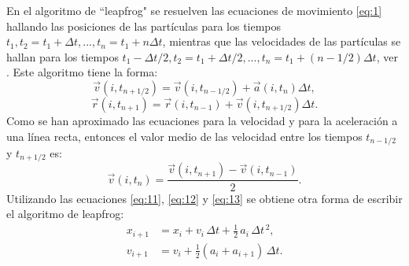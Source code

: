 En el algoritmo de ``leapfrog" se resuelven las ecuaciones de movimiento \eqref{eq:1} hallando las posiciones de las part\'{i}culas para los tiempos $t_1,t_2=t_1+\Delta t,...,t_n=t_{1}+n\Delta t$, mientras que las velocidades de las part\'{i}culas se hallan para los tiempos $t_1-\Delta t/2,t_2=t_1+\Delta t/2,...,t_n=t_{1}+(n-1/2)\Delta t$, ver \cite{Mazur1997CommonRevisited}.  Este algoritmo tiene la forma:
\begin{equation}\label{eq:11}
\vec{v}{(i,t_{n+1/2})}=\vec{v}{(i,t_{n-1/2})}+\vec{a}{(i,t_{n})}\Delta t,
\end{equation}
\begin{equation}\label{eq:12}
\vec{r}{(i,t_{n+1})}=\vec{r}{(i,t_{n-1})}+\vec{v}{(i,t_{n+1/2})}\Delta t.
\end{equation}
Como se han aproximado las ecuaciones para la velocidad y para la aceleraci\'{o}n a una l\'{i}nea recta, entonces el valor medio de las velocidad entre los tiempos $t_{n-1/2}$ y $t_{n+1/2}$ es:
\begin{equation}\label{eq:13}
\vec{v}{(i,t_{n})}=\frac{\vec{v}{(i,t_{n+1})}-\vec{v}{(i,t_{n-1})}}{2}.
\end{equation}
Utilizando las ecuaciones \eqref{eq:11}, \eqref{eq:12} y \eqref{eq:13} se obtiene otra forma de escribir el algoritmo de leapfrog:
\begin{eqnarray}
  x_{i+1} &= x_i + v_i\, \Delta t + \tfrac{1}{2}\,a_i\, \Delta t^{\,2}, \\
  v_{i+1} &= v_i + \tfrac{1}{2}(a_i + a_{i+1})\,\Delta t.
\end{eqnarray}

